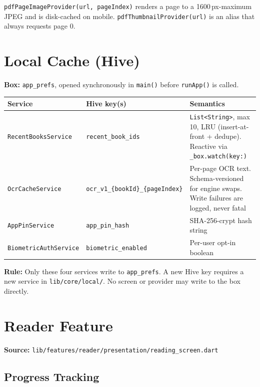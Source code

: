 \documentclass[11pt,a4paper]{article}
\begin{document}
\texttt{pdfPageImageProvider(url, pageIndex)} renders a page to a 1600\,px-maximum JPEG
and is disk-cached on mobile. \texttt{pdfThumbnailProvider(url)} is an alias that
always requests page 0.

\section{Local Cache (Hive)}

\textbf{Box:} \texttt{app\_prefs}, opened synchronously in \texttt{main()} before
\texttt{runApp()} is called.

\vspace{4pt}
\begin{tabularx}{\textwidth}{@{}L{4.0cm} L{3.4cm} L{6.3cm}@{}}
  \toprule
  \textbf{Service} & \textbf{Hive key(s)} & \textbf{Semantics} \\
  \midrule
  \texttt{RecentBooksService} & \texttt{recent\_book\_ids} &
    \texttt{List<String>}, max 10, LRU (insert-at-front + dedupe).
    Reactive via \texttt{\_box.watch(key:)} \\
  \texttt{OcrCacheService} & \texttt{ocr\_v1\_\{bookId\}\_\{pageIndex\}} &
    Per-page OCR text. Schema-versioned for engine swaps.
    Write failures are logged, never fatal \\
  \texttt{AppPinService} & \texttt{app\_pin\_hash} &
    SHA-256-crypt hash string \\
  \texttt{BiometricAuthService} & \texttt{biometric\_enabled} &
    Per-user opt-in boolean \\
  \bottomrule
\end{tabularx}
\vspace{2pt}

\textbf{Rule:} Only these four services write to \texttt{app\_prefs}. A new Hive key
requires a new service in \texttt{lib/core/local/}. No screen or provider may write to
the box directly.

\section{Reader Feature}

\textbf{Source:} \texttt{lib/features/reader/presentation/reading\_screen.dart}

\subsection{Progress Tracking}
\end{document}
